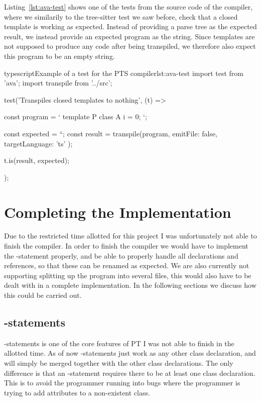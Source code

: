 Listing~\vref{lst:ava-test} shows one of the tests from the source code of the compiler, where we similarily to the tree-sitter test we saw before, check that a closed template is working as expected.
Instead of providing a parse tree as the expected result, we instead provide an expected program as the string.
Since templates are not supposed to produce any code after being transpiled, we therefore also expect this program to be an empty string.

\begin{code}{typescript}{Example of a test for the PTS compiler}{lst:ava-test}
    import test from 'ava';
    import transpile from '../src';

    test('Transpiles closed templates to nothing', (t) => {
        const program = `
    template P {
        class A {
            i = 0;
        }
    }
    `;

    const expected = ``;
    const result = transpile(program, { emitFile: false, targetLanguage: 'ts' });

    t.is(result, expected);
    });
\end{code}

\section{Completing the Implementation}\label{sec:completing-the-implementation}

Due to the restricted time allotted for this project I was unfortunately not able to finish the compiler.
In order to finish the compiler we would have to implement the -statement properly, and be able to properly handle all declarations and references, so that these can be renamed as expected.
We are also currently not supporting splitting up the program into several files, this would also have to be dealt with in a complete implementation.
In the following sections we discuss how this could be carried out.

\subsection{-statements}\label{subsec:addto-statements}

-statements is one of the core features of PT I was not able to finish in the allotted time.
As of now -statements just work as any other class declaration, and will simply be merged together with the other class declarations.
The only difference is that an -statement requires there to be at least one class declaration.
This is to avoid the programmer running into bugs where the programmer is trying to add attributes to a non-existent class.

